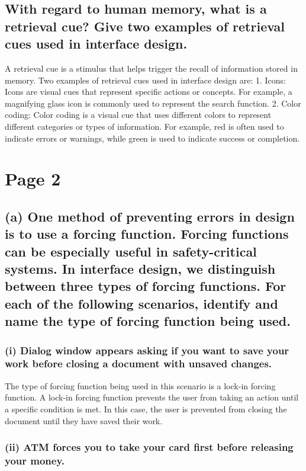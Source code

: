 \documentclass{article}
\begin{document}
\subsection{With regard to human memory, what is a retrieval cue? Give two examples
    of retrieval cues used in interface design.}

A retrieval cue is a stimulus that helps trigger the recall of information stored in memory.
Two examples of retrieval cues used in interface design are:
1. Icons: Icons are visual cues that represent specific actions or concepts.
For example, a magnifying glass icon is commonly used to represent the search function.
2. Color coding: Color coding is a visual cue that uses different colors to represent different categories or types of information.
For example, red is often used to indicate errors or warnings, while green is used to indicate success or completion.

\newpage

\section{Page 2}

\subsection{(a) One method of preventing errors in design is to use a forcing function.
    Forcing functions can be especially useful in safety-critical systems.
    In interface design, we distinguish between three types of forcing functions.
    For each of the following scenarios, identify and name the type of forcing
    function being used.}

\subsubsection{(i) Dialog window appears asking if you want to save your work before
    closing a document with unsaved changes.}

The type of forcing function being used in this scenario is a lock-in forcing function.
A lock-in forcing function prevents the user from taking an action until a specific condition is met.
In this case, the user is prevented from closing the document until they have saved their work.

\subsubsection{(ii) ATM forces you to take your card first before releasing your money.}
\end{document}
